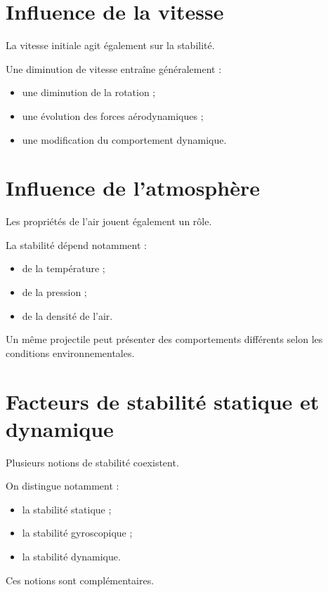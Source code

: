 \section{Influence de la vitesse}

La vitesse initiale agit également sur la stabilité.

Une diminution de vitesse entraîne généralement :

\begin{itemize}
    \item une diminution de la rotation ;
    \item une évolution des forces aérodynamiques ;
    \item une modification du comportement dynamique.
\end{itemize}

\section{Influence de l'atmosphère}

Les propriétés de l'air jouent également un rôle.

La stabilité dépend notamment :

\begin{itemize}
    \item de la température ;
    \item de la pression ;
    \item de la densité de l'air.
\end{itemize}

Un même projectile peut présenter des comportements différents selon les
conditions environnementales.

\section{Facteurs de stabilité statique et dynamique}

Plusieurs notions de stabilité coexistent.

On distingue notamment :

\begin{itemize}
    \item la stabilité statique ;
    \item la stabilité gyroscopique ;
    \item la stabilité dynamique.
\end{itemize}

Ces notions sont complémentaires.

